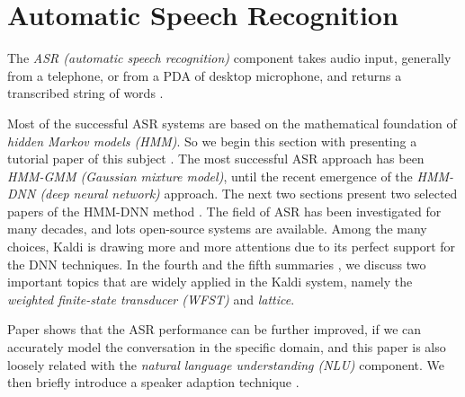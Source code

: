 \section{Automatic Speech Recognition} \label{Automatic Speech Recognition}

The \emph{ASR (automatic speech recognition)} component takes audio input, generally from a telephone, or from a PDA of desktop microphone, and returns a transcribed string of words \cite{Jurafsky2006}.

Most of the successful ASR systems are based on the mathematical foundation of \emph{hidden Markov models (HMM)}. So we begin this section with presenting a tutorial paper of this subject \cite{Rabiner1989A}. The most successful ASR approach has been \emph{HMM-GMM (Gaussian mixture model)}, until the recent emergence of the \emph{HMM-DNN (deep neural network)} approach. The next two sections present two selected papers of the HMM-DNN method \cite{Hinton2012Deep,Graves2013Speech}. The field of ASR has been investigated for many decades, and lots open-source systems are available. Among the many choices, Kaldi \cite{DanielPovey2014} is drawing more and more attentions due to its perfect support for the DNN techniques. In the fourth and the fifth summaries \cite{Mohri2000,Ljolje1999}, we discuss two important topics that are widely applied in the Kaldi system, namely the \emph{weighted finite-state transducer (WFST)} and \emph{lattice}. 

Paper \cite{Stolcke2000} shows that the ASR performance can be further improved, if we can accurately model the conversation in the specific domain, and this paper is also loosely related with the \emph{natural language understanding (NLU)} component.
We then briefly introduce a speaker adaption technique \cite{Leggetter1995}.









